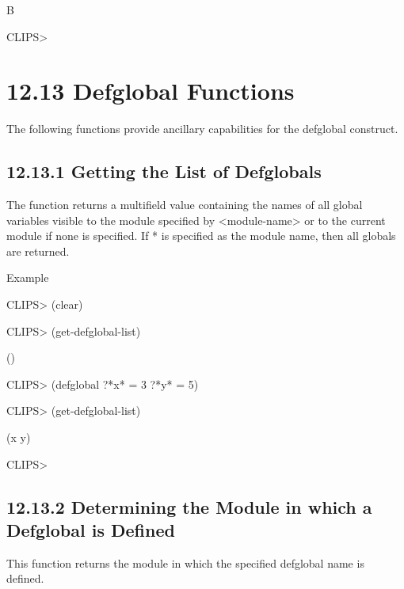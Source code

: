 \documentclass[letterpaper,10pt,english]{sphinxmanual}
\begin{document}
B

CLIPS\textgreater{}


\section{12.13 Defglobal Functions}
\label{\detokenize{actions:defglobal-functions}}
The following functions provide ancillary capabilities for the defglobal
construct.


\subsection{12.13.1 Getting the List of Defglobals}
\label{\detokenize{actions:getting-the-list-of-defglobals}}
The function  returns a multifield value
containing the names of all global variables visible to the module
specified by \textless{}module-name\textgreater{} or to the current module if none is
specified. If * is specified as the module name, then all globals are
returned.


\begin{sphinxVerbatim}[commandchars=\\\{\}]
 \PYG{p}{[}\PYG{p}{]}
\end{sphinxVerbatim}

Example

CLIPS\textgreater{} (clear)

CLIPS\textgreater{} (get-defglobal-list)

()

CLIPS\textgreater{} (defglobal ?*x* = 3 ?*y* = 5)

CLIPS\textgreater{} (get-defglobal-list)

(x y)

CLIPS\textgreater{}


\subsection{12.13.2 Determining the Module in which a Defglobal is Defined}
\label{\detokenize{actions:determining-the-module-in-which-a-defglobal-is-defined}}
This function returns the module in which the specified defglobal name
is defined.

\end{document}
